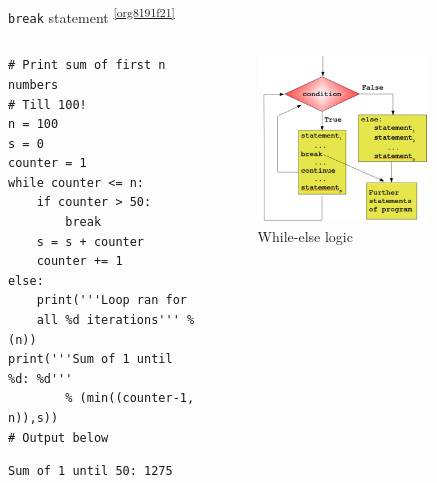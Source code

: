 \documentclass[presentation]{beamer}
\begin{document}
\begin{frame}[label={sec:org0a035cd},fragile]{\texttt{break} statement \textsuperscript{\ref{org8191f21}}}
 \begin{columns}
\begin{column}{0.48\columnwidth}
\scriptsize
\begin{verbatim}
# Print sum of first n numbers
# Till 100!
n = 100
s = 0
counter = 1
while counter <= n:
    if counter > 50:
        break
    s = s + counter
    counter += 1
else:
    print('''Loop ran for
    all %d iterations''' % (n))
print('''Sum of 1 until %d: %d'''
        % (min((counter-1, n)),s))
# Output below
\end{verbatim}

\begin{verbatim}
Sum of 1 until 50: 1275
\end{verbatim}
\end{column}


\begin{column}{0.45\columnwidth}
\footnotesize
\begin{figure}[htbp]
\centering
\includegraphics[width=0.8\textwidth]{images/while_loop_with_else_break.png}
\caption{While-else logic}
\end{figure}
\end{column}
\end{columns}
\end{frame}
\end{document}
